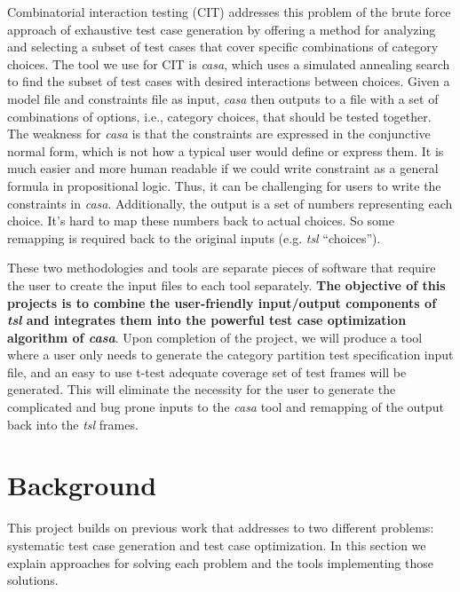 \documentclass[a4full,12pt]{article}
\begin{document}
Combinatorial interaction testing (CIT) addresses this problem of the brute force approach of exhaustive test case generation 
by offering a method for analyzing and selecting a subset of test cases
  that cover specific combinations of category choices. The tool we use for CIT is \emph{casa},
  which uses a simulated annealing search to find the subset of test cases with desired interactions between choices. Given a model file and
  constraints file as input, \emph{casa} then outputs to a file with a set of combinations of options, i.e., category choices, that should
  be tested together. The weakness for \emph{casa} is that the constraints are expressed in the conjunctive
  normal form, which is not how a typical user would define or express them. It is much easier and more human
  readable if we could write constraint as a general formula in propositional logic. Thus, it can be challenging for users to write the constraints in \emph{casa}.  Additionally, the output is a set of numbers representing each choice. It's hard to map these numbers back
  to actual choices. So some remapping is required back to the original inputs (e.g. \emph{tsl} ``choices'').
 
These two methodologies and tools are separate pieces of software that require the user to create the input files
  to each tool separately.  {\bf The objective of this projects is to combine the user-friendly input/output components
  of \emph{tsl} and integrates them into the powerful test case optimization algorithm of \emph{casa}}. Upon completion of
  the project, we will produce a tool where a user only needs to generate the category partition test specification input file, and an
  easy to use t-test adequate coverage set of test frames will be generated. This will eliminate the necessity for the
  user to generate the complicated and bug prone inputs to the \emph{casa} tool and remapping of the output back into the \emph{tsl} frames.
  
\section{Background}
This project builds on previous work that addresses to
  two different problems: systematic test case generation and test case optimization. In this section we explain approaches for solving each problem and the tools implementing those solutions.
\end{document}
